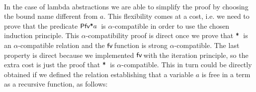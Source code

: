 \documentclass{entcs}
\newcommand{\alp}{\ensuremath{\alpha}}
\newcommand{\lambAg}[2]{\ensuremath{\AgdaInductiveConstructor{ƛ}\, #1\, #2}}
\newcommand{\inAg}{\ensuremath{\mathbin{\AgdaFunction{∈}}}}
\newcommand{\neqAg}{\ensuremath{\mathbin{\AgdaInductiveConstructor{≢}}}}
\newcommand{\fv}{\ensuremath{{\AgdaFunction{fv}}\,}}
\newcommand{\perm}{\ensuremath{\mathbin{\AgdaFunction{∙}}}}
\newcommand{\free}{\ensuremath{\mathbin{\AgdaFunction{*}}}}
\newcommand{\choiceAg}{\ensuremath{\AgdaFunction{χ}\,}}
\begin{document}
\begin{code}%
\> \AgdaSymbol{:}     \<%
\\
\>   \AgdaSymbol{=}       \AgdaDatatype{*} \<%
\end{code}


\noindent In the  case of lambda abstractions we are able to simplify the proof by choosing the bound name different from $a$. 
This flexibility comes at a cost, i.e. we need to prove that the predicate $\AgdaFunction{Pfv*} a$\ is \alp-compatible in order to use the chosen induction principle. This \alp-compatibility proof is direct once we prove that \free\ is an \alp-compatible relation and the \fv function is strong \alp-compatible. The last property is direct because we implemented \fv with the iteration principle, so the extra cost is just the proof that \free\ is \alp-compatible. This in turn could be directly obtained if we defined the relation establishing that a variable $a$ is free in a term as a recursive function, as follows:
\end{document}
